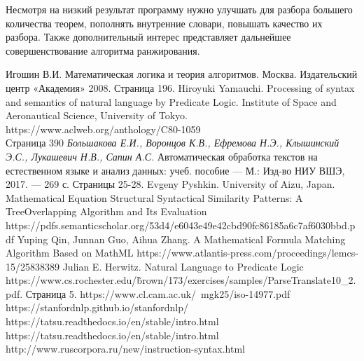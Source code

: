 \documentclass[12pt]{article}
\begin{document}
Несмотря на низкий результат программу нужно улучшать для разбора большего количества теорем, пополнять внутренние словари, повышать качество их разбора. Также дополнительный интерес представляет дальнейшее совершенствование алгоритма ранжирования.

\newpage
{}
\begin{thebibliography}{}
Игошин В.И. Математическая логика и теория алгоритмов. Москва. Издательский центр «Академия» 2008. Страница 196.
Hiroyuki Yamauchi. Processing of syntax and semantics of natural language by Predicate Logic. Institute of Space and Aeronautical Science, University of Tokyo. 
https://www.aclweb.org/anthology/C80-1059 \\
Страница 390
 \textit{Большакова Е.И., Воронцов К.В., Ефремова Н.Э.,
Клышинский Э.С., Лукашевич Н.В., Сапин А.С.} Автоматическая обработка текстов на естественном языке и анализ
данных: учеб. пособие — М.: Изд-во НИУ ВШЭ,
2017. — 269 с. Страницы 25-28.
Evgeny Pyshkin. University of Aizu, Japan. Mathematical Equation Structural Syntactical Similarity Patterns: A TreeOverlapping Algorithm and Its Evaluation
https://pdfs.semanticscholar.org/53d4/e6043e49e42cbd90fc86185a6c7af6030bbd.pdf
Yuping Qin, Junnan Guo, Aihua Zhang. A Mathematical Formula Matching Algorithm Based on MathML
https://www.atlantis-press.com/proceedings/lemcs-15/25838389
Julian E. Herwitz. Natural Language to Predicate Logic https://www.cs.rochester.edu/\~brown/173/exercises/samples/ParseTranslate10\_2.pdf. Страница 5.
https://www.cl.cam.ac.uk/~mgk25/iso-14977.pdf
https://stanfordnlp.github.io/stanfordnlp/
https://tatsu.readthedocs.io/en/stable/intro.html
https://tatsu.readthedocs.io/en/stable/intro.html
http://www.ruscorpora.ru/new/instruction-syntax.html





\end{thebibliography}
\end{document}
